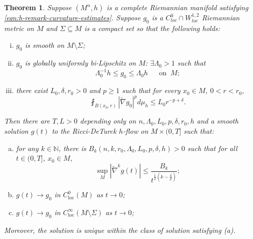\documentclass[12pt]{amsart}
\theoremstyle{plain}
\newtheorem{theorem}[subsection]{Theorem}
\theoremstyle{plain}
\theoremstyle{definition}
\theoremstyle{remark}
\numberwithin{equation}{subsection}
\newcommand{\hdel}{\tilde{\nabla}}
\begin{document}
\begin{theorem}\label{thm:intro-application-1-statement}
    Suppose $(M^n, h)$ is a complete Riemannian manifold satisfying \eqref{eqn:h-remark-curvature-estimates}. Suppose $g_0$ is a $C^0_{loc}\cap W^{1,2}_{loc}$ Riemannian metric on $M$ and $\Sigma \subseteq M$ is a compact set so that the following holds:
    \begin{enumerate}[(i)]
        \item $g_0$ is smooth on $M \setminus \Sigma$;
        \item $g_0$ is globally uniformly bi-Lipschitz on $M$: 
         $\exists\Lambda_0 > 1$ such that $$\Lambda_0^{-1} h \leq g_0 \leq \Lambda_0 h\;\;\quad\text{on}\;\;M;$$
        \item there exist $L_0,\delta,r_0 > 0$ and $p\geq 1$ such that for every $x_0 \in M$, $0 < r < r_0$,
        \begin{equation*}
            \fint_{B(x_0,r)} |\hdel g_0|^p d\mu_h \leq L_0 r^{-p+\delta}.
        \end{equation*}
    \end{enumerate}
    Then there are $T,L>0$ depending only on  $n, \Lambda_0, L_0, p, \delta, r_0,h$ and a smooth solution $g(t)$ to the Ricci-DeTurck $h$-flow on $M\times(0,T]$ such that:
        \begin{enumerate}[(a)]
            \item for any $k \in \mathbb{N}$, there is $B_k(n, k,r_0, \Lambda_0, L_0, p, \delta,h) > 0$ such that for all $t \in (0, T]$, $x_0 \in M$,
            \begin{equation*}
                \sup\limits_{M}|\hdel^k g(t)| \leq \frac{B_k}{t^{\frac{1}{2}(k-\frac{\delta}{p})}};
            \end{equation*}
            \item $g(t) \to g_0$ in $C_\text{loc}^0(M)$ as $t \to 0$;
            \item $g(t) \to g_0$ in $C_\text{loc}^\infty(M\setminus\Sigma)$ as $t \to 0$;
        \end{enumerate}
        Moreover, the solution is unique within the class of solution satisfying (a).
\end{theorem}
\end{document}
